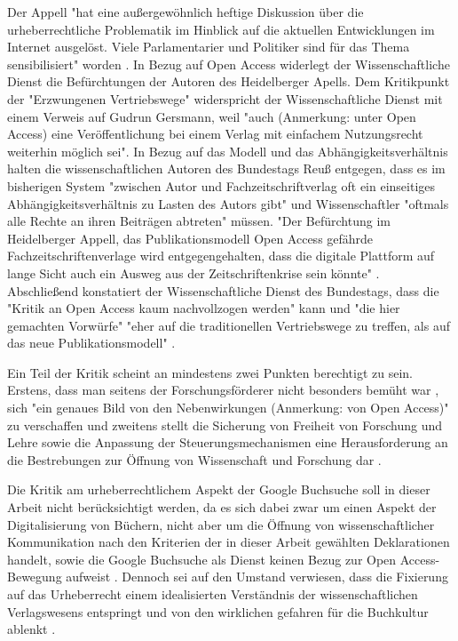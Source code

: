 Der Appell "hat eine außergewöhnlich heftige Diskussion über die urheberrechtliche Problematik im Hinblick auf die aktuellen Entwicklungen im Internet ausgelöst. Viele Parlamentarier und Politiker sind für das Thema sensibilisiert" worden \cite{WD_bundestag_2009}. In Bezug auf Open Access widerlegt der Wissenschaftliche Dienst die Befürchtungen der Autoren des Heidelberger Apells. Dem Kritikpunkt der "Erzwungenen Vertriebswege" widerspricht der Wissenschaftliche Dienst mit einem Verweis auf Gudrun Gersmann, weil "auch (Anmerkung: unter Open Access) eine Veröffentlichung bei einem Verlag mit einfachem Nutzungsrecht weiterhin möglich sei". In Bezug auf das Modell und das Abhängigkeitsverhältnis halten die wissenschaftlichen Autoren des Bundestags Reuß entgegen, dass es im bisherigen System "zwischen Autor und Fachzeitschriftverlag oft ein einseitiges Abhängigkeitsverhältnis zu Lasten des Autors gibt" und Wissenschaftler "oftmals alle Rechte an ihren Beiträgen abtreten" \cite{WD_bundestag_2009} müssen. "Der Befürchtung im Heidelberger Appell, das Publikationsmodell Open Access gefährde Fachzeitschriftenverlage wird entgegengehalten, dass die digitale Plattform auf lange Sicht auch ein Ausweg aus der Zeitschriftenkrise sein könnte" \cite{WD_bundestag_2009}. Abschließend konstatiert der Wissenschaftliche Dienst des Bundestags, dass die "Kritik an Open Access kaum nachvollzogen werden" kann und "die hier gemachten Vorwürfe" "eher auf die traditionellen Vertriebswege zu treffen, als auf das neue Publikationsmodell" \cite{WD_bundestag_2009}.

Ein Teil der Kritik scheint an mindestens zwei Punkten berechtigt zu sein. Erstens, dass man seitens der Forschungsförderer nicht besonders bemüht war \cite{suchen}, sich "ein genaues Bild von den Nebenwirkungen (Anmerkung: von Open Access)" \cite{Reuss_2009} zu verschaffen und zweitens stellt die Sicherung von Freiheit von Forschung und Lehre sowie die Anpassung der Steuerungsmechanismen eine Herausforderung an die Bestrebungen zur Öffnung von Wissenschaft und Forschung dar \cite{hagner_2015_sache_buches}.

Die Kritik am urheberrechtlichem Aspekt der Google Buchsuche soll in dieser Arbeit nicht berücksichtigt werden, da es sich dabei zwar um einen Aspekt der Digitalisierung von Büchern, nicht aber um die Öffnung von wissenschaftlicher Kommunikation nach den Kriterien der in dieser Arbeit gewählten Deklarationen handelt, sowie die Google Buchsuche als Dienst keinen Bezug zur Open Access-Bewegung aufweist \cite{hagner_2015_sache_buches}. Dennoch sei auf den Umstand verwiesen, dass die Fixierung auf das Urheberrecht einem idealisierten Verständnis der wissenschaftlichen Verlagswesens entspringt und von den wirklichen gefahren für die Buchkultur ablenkt \cite{Hirschi_2015_buch_oa}.

